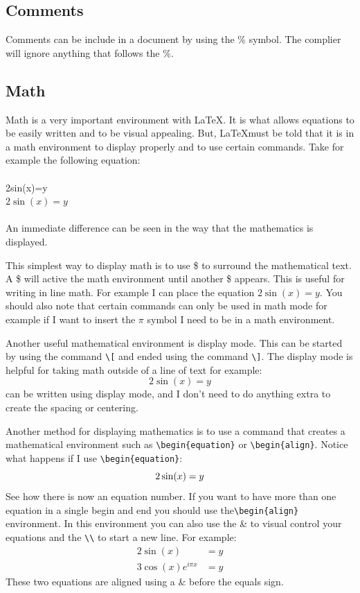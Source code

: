 \documentclass{article} 	%
\numberwithin{equation}{section}
\begin{document}
		\subsection{Comments}
		Comments can be include in a document by using the \% symbol.  The complier will ignore anything that follows the \%.
		
		\subsection{Math}
		Math is a very important environment with \LaTeX.  It is what allows equations to be easily written and to be visual appealing.  But, \LaTeX must be told that it is in a math environment to display properly and to use certain commands.  Take for example the following equation:\\
		\\
		2sin(x)=y \\
		$2\sin(x)=y$\\
		\\
		An immediate difference can be seen in the way that the mathematics is displayed.
		
		This simplest way to display math is to use \$ to surround the mathematical text.  A \$ will active the math environment until another \$ appears.  This is useful for writing in line math.  For example I can place the equation $2\sin(x)=y$.  You should also note that certain commands can only be used in math mode for example if I want to insert the $\pi$ symbol I need to be in a math environment.
		
		Another useful mathematical environment is display mode.  This can be started by using the command \verb|\[| and ended using the command \verb|\]|.  The display mode is helpful for taking math outside of a line of text for example: \[2\sin(x)=y\] can be written using display mode, and I don't need to do anything extra to create the spacing or centering.
		
		Another method for displaying mathematics is to use a command that creates a mathematical environment such as \verb|\begin{equation}| or \verb|\begin{align}|.  Notice what happens if I use \verb|\begin{equation}|:  
		\begin{equation}
			2\sin(x)=y \\
		\end{equation}
		See how there is now an equation number.  If you want to have more than one equation in a single begin and end you should use the\verb|\begin{align}| environment.  In this environment you can also use the \& to visual control your equations and the \verb|\\| to start a new line.  For example:
		\begin{align}
			2\sin(x)&=y \\
			3\cos(x)e^{i\pi x}&=y
		\end{align} 
		These two equations are aligned using a \& before the equals sign.
		
\end{document}
